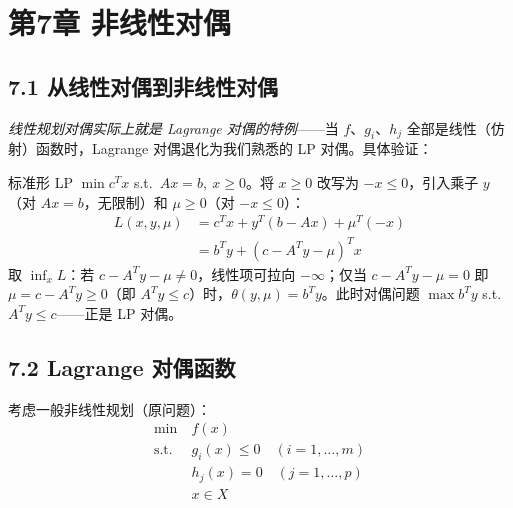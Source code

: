 \section{第7章 \quad 非线性对偶}

\subsection{7.1 从线性对偶到非线性对偶}


\emph{线性规划对偶实际上就是 Lagrange 对偶的特例}——当 $f$、$g_i$、$h_j$ 全部是线性（仿射）函数时，Lagrange 对偶退化为我们熟悉的 LP 对偶。具体验证：

标准形 LP $\min c^T x$ s.t.\ $Ax=b,\ x\ge0$。将 $x\ge0$ 改写为 $-x\le0$，引入乘子 $y$（对 $Ax=b$，无限制）和 $\mu\ge0$（对 $-x\le0$）：
\begin{align*}
L(x,y,\mu) &= c^T x + y^T(b-Ax) + \mu^T(-x) \\
           &= b^T y + (c - A^T y - \mu)^T x
\end{align*}
取 $\inf_x L$：若 $c-A^T y-\mu\neq0$，线性项可拉向 $-\infty$；仅当 $c-A^T y-\mu=0$ 即 $\mu=c-A^T y\ge0$（即 $A^T y\le c$）时，$\theta(y,\mu)=b^T y$。此时对偶问题 $\max b^T y$ s.t.\ $A^T y\le c$——正是 LP 对偶。


\subsection{7.2 Lagrange 对偶函数}

考虑一般非线性规划（原问题）：
\[
\begin{aligned}
\min\ & f(x) \\
\text{s.t.}\ & g_i(x) \le 0 \quad (i=1,\dots,m) \\
& h_j(x) = 0 \quad (j=1,\dots,p) \\
& x \in X
\end{aligned}
\]

